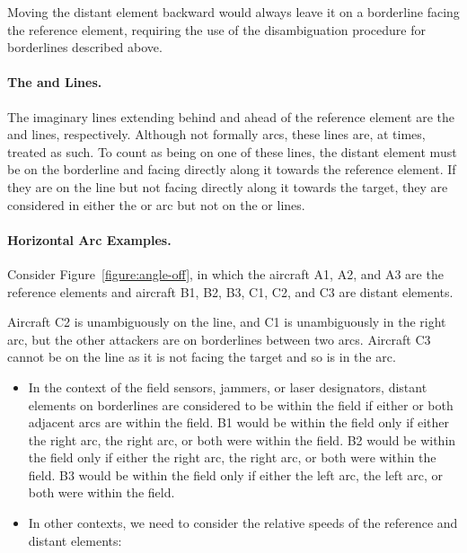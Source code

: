 {Moving the distant element backward would always leave it on a borderline facing the reference element, requiring the use of the disambiguation procedure for borderlines described above.

\paragraph{The  and  Lines.} The imaginary lines extending behind and ahead of the reference element are the  and  lines, respectively. Although not formally arcs, these lines are, at times, treated as such. To count as being on one of these lines, the distant element must be on the borderline and facing directly along it towards the reference element. If they are on the line but not facing directly along it towards the target, they are considered in either the  or  arc but not on the  or  lines.

\paragraph{Horizontal Arc Examples.}

Consider Figure~\ref{figure:angle-off}, in which the aircraft A1, A2, and A3 are the reference elements and aircraft B1, B2,  B3, C1, C2, and C3 are distant elements. 

Aircraft C2 is unambiguously on the  line, and C1 is unambiguously in the right  arc, but the other attackers are on borderlines between two arcs. Aircraft C3 cannot be on the  line as it is not facing the target and so is in the  arc.

\begin{itemize}

\item
In the context of the field sensors, jammers, or laser designators, distant elements on borderlines are considered to be within the field if either or both adjacent arcs are within the field. B1 would be within the field only if either the right  arc, the right  arc, or both were within the field. B2 would be within the field only if either the right  arc, the right  arc, or both were within the field. B3 would be within the field only if either the left  arc, the left  arc, or both were within the field.

\item In other contexts, we need to consider the relative speeds of the reference and distant elements:


\end{itemize}}
